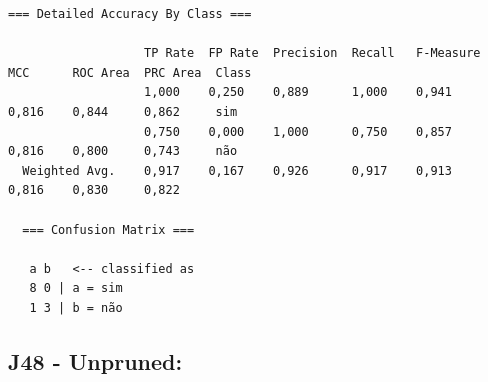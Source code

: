 \documentclass[
    article,            %
    11pt,               %
    oneside,            %
    a4paper,            %
    english,            %
    brazil,             %
    sumario=tradicional,
    ]{abntex2}
\begin{document}
\begin{itemize}
\begin{Verbatim}[frame=single, fontsize=\tiny]
  === Detailed Accuracy By Class ===

                   TP Rate  FP Rate  Precision  Recall   F-Measure  MCC      ROC Area  PRC Area  Class
                   1,000    0,250    0,889      1,000    0,941      0,816    0,844     0,862     sim
                   0,750    0,000    1,000      0,750    0,857      0,816    0,800     0,743     não
  Weighted Avg.    0,917    0,167    0,926      0,917    0,913      0,816    0,830     0,822     

  === Confusion Matrix ===

   a b   <-- classified as
   8 0 | a = sim
   1 3 | b = não
  \end{Verbatim}
\end{itemize}

\subsection{\textbf{J48 - Unpruned:}}
\end{document}
